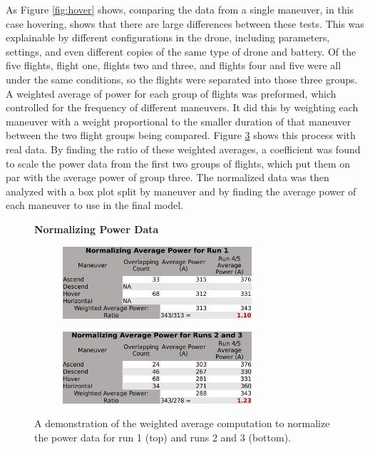 \documentclass{article}
\begin{document}
As Figure \ref{fig:hover} shows, comparing the data from a single maneuver, in this case hovering, shows that there are large differences between these tests. This was explainable by different configurations in the drone, including parameters, settings, and even different copies of the same type of drone and battery. Of the five flights, flight one, flights two and three, and flights four and five were all under the same conditions, so the flights were separated into those three groups. A weighted average of power for each group of flights was preformed, which controlled for the frequency of different maneuvers. It did this by weighting each maneuver with a weight proportional to the smaller duration of that maneuver between the two flight groups being compared. Figure  \ref{fig:Norm} shows this process with real data. By finding the ratio of these weighted averages, a coefficient was found to scale the power data from the first two groups of flights, which put them on par with the average power of group three. The normalized data was then analyzed with a box plot split by maneuver and by finding the average power of each maneuver to use in the final model.\par

\begin{figure}
\centering
\large{\textbf{Normalizing Power Data}}\par
\begin{subfigure}[b]{0.5\textwidth}
  \centering
   \includegraphics[width=70mm]{images/Normalizing1.png}
  \label{fig:sub1}
\end{subfigure}%
\begin{subfigure}[b]{0.5\textwidth}
  \centering
  \includegraphics[width=70mm]{images/Normalizing2.png}
  \label{fig:sub2}
\end{subfigure}
\caption{A demonstration of the weighted average computation to normalize the power data for run 1 (top) and runs 2 and 3 (bottom).}
\label{fig:Norm}
\end{figure}
\end{document}
